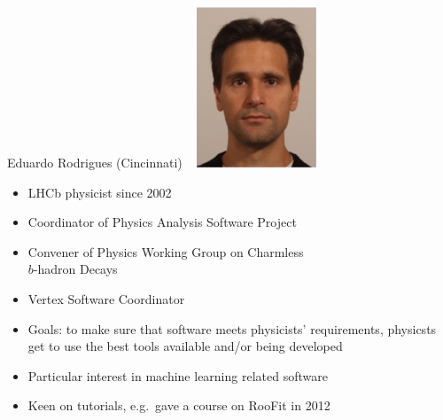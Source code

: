 \documentclass{beamer}
\begin{document}
\begin{frame}{Eduardo Rodrigues (Cincinnati)}
\mbox{ } \hfill \includegraphics[height=2 cm]{eduardo_rodrigues.png}

\vspace{-2 cm}
\begin{itemize}
\item LHCb physicist since 2002
\item Coordinator of Physics Analysis Software Project
\item Convener of Physics Working Group on Charmless \\ $b$-hadron Decays
\item Vertex Software Coordinator
\end{itemize}

\vspace{0.25 cm}
\begin{itemize}
\item Goals: to make sure that software meets physicists' requirements, physicsts get to use the best tools available and/or being developed
\item Particular interest in machine learning related software
\item Keen on tutorials, e.g.\ gave a course on RooFit in 2012
\end{itemize}
\end{frame}
\end{document}
